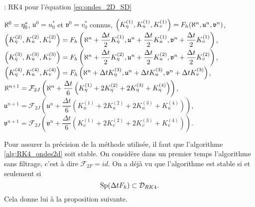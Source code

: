 \begin{center}
\begin{minipage}[H]{12cm}
  \begin{algorithm}[H]
    \caption{: RK4 pour l'équation \eqref{eq:ondes_2D_SD}}\label{alg:RK4_ondes2d}
    \begin{algorithmic}[1]
    \State $\aleph^0 = \eta_0^*$, $\mathfrak{u}^0 = u_0^*$ et $\mathfrak{v}^0 = v_0^*$ connus,
             \State  $\left(K^{(1)}_{\eta}, K^{(1)}_{u}, K^{(1)}_{v}\right) = F_h(\aleph^n, \mathfrak{u}^n, \mathfrak{v}^n)$,
             \State  $\left(K^{(2)}_{\eta}, K^{(2)}_{u}, K^{(2)}_{v}\right) = F_h\left(\aleph^n + \dfrac{\Delta t}{2}K^{(1)}_{\eta}, \mathfrak{u}^n + \dfrac{\Delta t}{2}K^{(1)}_{u}, \mathfrak{v}^n + \dfrac{\Delta t}{2}K^{(1)}_{v}\right)$,
             \State   $\left(K^{(3)}_{\eta}, K^{(3)}_{u}, K^{(3)}_{v}\right) = F_h\left(\aleph^n + \dfrac{\Delta t}{2}K^{(2)}_{\eta}, \mathfrak{u}^n + \dfrac{\Delta t}{2}K^{(2)}_{u}, \mathfrak{v}^n + \dfrac{\Delta t}{2}K^{(2)}_{v}\right)$,
             \State   $\left(K^{(4)}_{\eta}, K^{(4)}_{u}, K^{(4)}_{v}\right) = F_h\left(\aleph^n + \Delta t K^{(3)}_{\eta}, \mathfrak{u}^n + \Delta tK^{(3)}_{u}, \mathfrak{v}^n + \Delta t K^{(3)}_{v}\right)$,
             \State  $\aleph^{n+1} = \mathcal{F}_{2J}\left( \aleph^n  + \dfrac{\Delta t}{6} \left( K^{(1)}_{\eta} + 2 K^{(2)}_{\eta} + 2 K^{(3)}_{\eta} + K^{(4)}_{\eta} \right) \right)$,
             \State  $\mathfrak{u}^{n+1} = \mathcal{F}_{2J}\left( \mathfrak{u}^n  + \dfrac{\Delta t}{6} \left( K^{(1)}_{u} + 2 K^{(2)}_{u} + 2 K^{(3)}_{u} + K^{(4)}_{u} \right) \right)$,
             \State  $\mathfrak{v}^{n+1} = \mathcal{F}_{2J}\left( \mathfrak{v}^n  + \dfrac{\Delta t}{6} \left( K^{(1)}_{v} + 2 K^{(2)}_{v} + 2 K^{(3)}_{v} + K^{(4)}_{v} \right) \right)$.
            \EndFor
    \end{algorithmic}
    \end{algorithm}
\end{minipage}
\end{center}
Pour assurer la précision de la méthode utilisée, il faut que l'algorithme \eqref{alg:RK4_ondes2d} soit stable. On considère dans un premier temps l'algorithme sans filtrage, c'est à dire $\mathcal{F}_{2F}=id$. On a déjà vu que l'algorithme est stable si et seulement si
\begin{equation}
\text{Sp} ( \Delta t F_h ) \subset \mathcal{D}_{RK4}.
\end{equation}
Cela donne lui à la proposition suivante.

